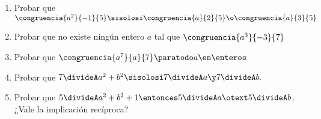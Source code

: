 \begin{enunciado}{\ejercicio}
  \begin{enumerate}[label=\alph*)]
    \item Probar que $\congruencia{a^2}{-1}{5} \sisolosi \congruencia{a}{2}{5}  \o \congruencia{a}{3}{5}$
    \item Probar que no existe ningún entero $a$ tal que $\congruencia{a^3}{-3}{7}$
    \item Probar que $\congruencia{a^7}{a}{7} \paratodo a \en \enteros$
    \item Probar que $7 \divideA a^2 + b^2 \sisolosi 7 \divideA a \y 7 \divideA b.$
    \item Probar que $5 \divideA a^2 + b^2 + 1 \entonces 5 \divideA a \otext 5 \divideA b$.
          ¿Vale la implicación recíproca?
  \end{enumerate}
\end{enunciado}

